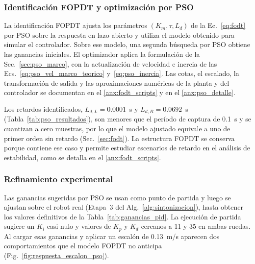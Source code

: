 \subsubsection{Identificación FOPDT y optimización por PSO}
\label{sec:identificacion_pso}

La identificación FOPDT ajusta los parámetros $(K_m,\tau,L_d)$ de la
Ec.~\eqref{eq:fodt} por PSO sobre la respuesta en lazo abierto y utiliza el
modelo obtenido para simular el controlador. Sobre ese modelo, una segunda
búsqueda por PSO obtiene las ganancias iniciales. El optimizador aplica la
formulación de la Sec.~\ref{sec:pso_marco}, con la actualización de velocidad
e inercia de las Ecs.~\eqref{eq:pso_vel_marco_teorico}
y~\eqref{eq:pso_inercia}. Las cotas, el escalado, la transformación de salida y
las aproximaciones numéricas de la planta y del controlador se documentan en el
\ref{anx:fodt_scripts} y en el \ref{anx:pso_detalle}.

Los retardos identificados, $L_{d,L}=0.0001$~s y $L_{d,R}=0.0692$~s
(Tabla~\ref{tab:pso_resultados}), son menores que el período de captura de
0.1~s y se cuantizan a cero muestras, por lo que el modelo ajustado equivale a
uno de primer orden sin retardo (Sec.~\ref{sec:fodt}). La estructura FOPDT se
conserva porque contiene ese caso y permite estudiar escenarios de retardo en
el análisis de estabilidad, como se detalla en el \ref{anx:fodt_scripts}.

\subsubsection{Refinamiento experimental}
\label{subsec:refinamiento_iterativo}

Las ganancias sugeridas por PSO se usan como punto de partida y luego se
ajustan sobre el robot real (Etapa~3 del
Alg.~\ref{alg:sintonizacion}), hasta obtener los valores definitivos de la
Tabla~\ref{tab:ganancias_pid}. La ejecución de partida sugiere un $K_i$ casi
nulo y valores de $K_p$ y $K_d$ cercanos a 11 y 35 en ambas ruedas. Al cargar esas ganancias y aplicar un escalón de
0.13~m/s aparecen dos comportamientos que el modelo FOPDT no anticipa
(Fig.~\ref{fig:respuesta_escalon_pso}).

